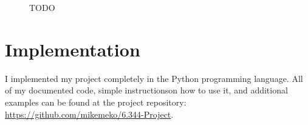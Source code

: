 \documentclass[12pt]{amsart}
\begin{document}
\begin{figure}
\endminipage
\caption{TODO}\label{fig:TODO}
\end{figure}

\section{Implementation}

I implemented my project completely in the Python programming language. All of my documented code, simple instructionson  how to use it, and additional examples can be found at the project repository: \url{https://github.com/mikemeko/6.344-Project}.
\end{document}
